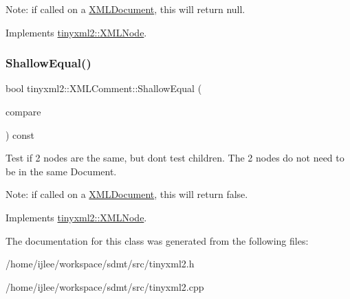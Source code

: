 Note\+: if called on a \hyperlink{classtinyxml2_1_1_x_m_l_document}{X\+M\+L\+Document}, this will return null. 

Implements \hyperlink{classtinyxml2_1_1_x_m_l_node_a8402cbd3129d20e9e6024bbcc0531283}{tinyxml2\+::\+X\+M\+L\+Node}.

\mbox{\label{classtinyxml2_1_1_x_m_l_comment_a965d880a99d58dd915caa88dc37a9b51}} 
\subsubsection{\texorpdfstring{Shallow\+Equal()}{ShallowEqual()}}
{\footnotesize\ttfamily bool tinyxml2\+::\+X\+M\+L\+Comment\+::\+Shallow\+Equal (\begin{DoxyParamCaption}\item[{const \hyperlink{classtinyxml2_1_1_x_m_l_node}{X\+M\+L\+Node} $\ast$}]{compare }\end{DoxyParamCaption}) const\hspace{0.3cm}{\ttfamily [virtual]}}

Test if 2 nodes are the same, but don\textquotesingle{}t test children. The 2 nodes do not need to be in the same Document.

Note\+: if called on a \hyperlink{classtinyxml2_1_1_x_m_l_document}{X\+M\+L\+Document}, this will return false. 

Implements \hyperlink{classtinyxml2_1_1_x_m_l_node_a7ce18b751c3ea09eac292dca264f9226}{tinyxml2\+::\+X\+M\+L\+Node}.



The documentation for this class was generated from the following files\+:\begin{DoxyCompactItemize}
\item 
/home/ijlee/workspace/sdmt/src/tinyxml2.\+h\item 
/home/ijlee/workspace/sdmt/src/tinyxml2.\+cpp\end{DoxyCompactItemize}
